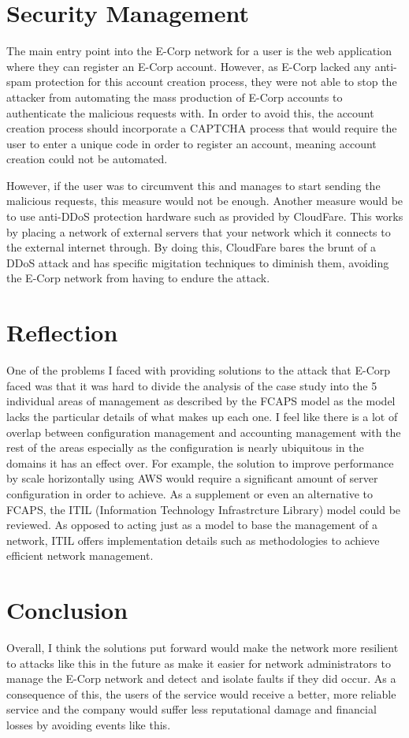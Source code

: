 \documentclass[]{report}
\begin{document}
\section*{Security Management}
The main entry point into the E-Corp network for a user is the web application where they can register an E-Corp account. However, as E-Corp lacked any anti-spam protection for this account creation process, they were not able to stop the attacker from automating the mass production of E-Corp accounts to authenticate the malicious requests with. In order to avoid this, the account creation process should incorporate a CAPTCHA process that would require the user to enter a unique code in order to register an account, meaning account creation could not be automated.

However, if the user was to circumvent this and manages to start sending the malicious requests, this measure would not be enough. Another measure would be to use anti-DDoS protection hardware such as provided by CloudFare. This works by placing a network of external servers that your network which it connects to the external internet through. By doing this, CloudFare bares the brunt of a DDoS attack and has specific migitation techniques to diminish them, avoiding the E-Corp network from having to endure the attack.

\section*{Reflection}
One of the problems I faced with providing solutions to the attack that E-Corp faced was that it was hard to divide the analysis of the case study into the 5 individual areas of management as described by the FCAPS model as the model lacks the particular details of what makes up each one. I feel like there is a lot of overlap between configuration management and accounting management with the rest of the areas especially as the configuration is nearly ubiquitous in the domains it has an effect over. For example, the solution to improve performance by scale horizontally using AWS would require a significant amount of server configuration in order to achieve. As a supplement or even an alternative to FCAPS, the ITIL (Information Technology Infrastrcture Library) model could be reviewed. As opposed to acting just as a model to base the management of a network, ITIL offers implementation details such as methodologies to achieve efficient network management.

\section{Conclusion}
Overall, I think the solutions put forward would make the network more resilient to attacks like this in the future as make it easier for network administrators to manage the E-Corp network and detect and isolate faults if they did occur. As a consequence of this, the users of the service would receive a better, more reliable service and the company would suffer less reputational damage and financial losses by avoiding events like this.
\end{document}
